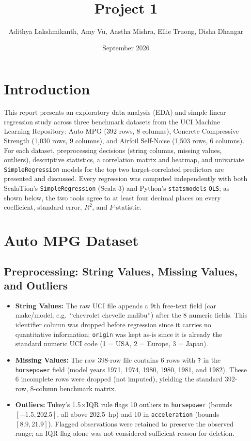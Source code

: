 \documentclass{article}
\title{Project 1}
\author{Adithya Lakshmikanth, Amy Vu, Aastha Mishra, Ellie Truong, Disha Dhangar}
\date{September 2026}
\begin{document}
\maketitle

\section{Introduction}
This report presents an exploratory data analysis (EDA) and simple linear regression study across three benchmark datasets from the UCI Machine Learning Repository: Auto MPG (392 rows, 8 columns), Concrete Compressive Strength (1{,}030 rows, 9 columns), and Airfoil Self-Noise (1{,}503 rows, 6 columns). For each dataset, preprocessing decisions (string columns, missing values, outliers), descriptive statistics, a correlation matrix and heatmap, and univariate \texttt{SimpleRegression} models for the top two target-correlated predictors are presented and discussed. Every regression was computed independently with both ScalaTion's \texttt{SimpleRegression} (Scala 3) and Python's \texttt{statsmodels} \texttt{OLS}; as shown below, the two tools agree to at least four decimal places on every coefficient, standard error, $R^2$, and $F$-statistic.


\section{Auto MPG Dataset}

\subsection{Preprocessing: String Values, Missing Values, and Outliers}
\begin{itemize}
    \item \textbf{String Values:} The raw UCI file appends a 9th free-text field (car make/model, e.g.\ ``chevrolet chevelle malibu'') after the 8 numeric fields. This identifier column was dropped before regression since it carries no quantitative information; \texttt{origin} was kept as-is since it is already the standard numeric UCI code (1 = USA, 2 = Europe, 3 = Japan).
    \item \textbf{Missing Values:} The raw 398-row file contains 6 rows with \texttt{?} in the \texttt{horsepower} field (model years 1971, 1974, 1980, 1980, 1981, and 1982). These 6 incomplete rows were dropped (not imputed), yielding the standard 392-row, 8-column benchmark matrix.
    \item \textbf{Outliers:} Tukey's 1.5$\times$IQR rule flags 10 outliers in \texttt{horsepower} (bounds $[-1.5, 202.5]$, all above 202.5~hp) and 10 in \texttt{acceleration} (bounds $[8.9, 21.9]$). Flagged observations were retained to preserve the observed range; an IQR flag alone was not considered sufficient reason for deletion.
\end{itemize}
\end{document}
